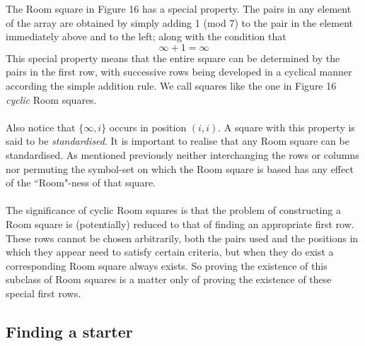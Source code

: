 \documentclass[
  12pt,
  a4paper]{book}
\begin{document}
The Room square in Figure 16 has a special property. The pairs in any
element of the array are obtained by simply adding 1 (mod 7) to the pair
in the element immediately above and to the left; along with the
condition that \[\infty+1 = \infty\] This special property means that
the entire square can be determined by the pairs in the first row, with
successive rows being developed in a cyclical manner according the
simple addition rule. We call squares like the one in Figure 16
\emph{cyclic} Room squares.\\
~\\
Also notice that \(\{\infty,i\}\) occurs in position \((i,i)\). A square
with this property is said to be \emph{standardised}. It is important to
realise that any Room square can be standardised. As mentioned
previously neither interchanging the rows or columns nor permuting the
symbol-set on which the Room square is based has any effect of the
``Room"-ness of that square.\\
~\\
The significance of cyclic Room squares is that the problem of
constructing a Room square is (potentially) reduced to that of finding
an appropriate first row. These rows cannot be chosen arbitrarily, both
the pairs used and the positions in which they appear need to satisfy
certain criteria, but when they do exist a corresponding Room square
always exists. So proving the existence of this subclass of Room squares
is a matter only of proving the existence of these special first rows.

\hypertarget{finding-a-starter}{%
\subsection{Finding a starter}\label{finding-a-starter}}
\end{document}
